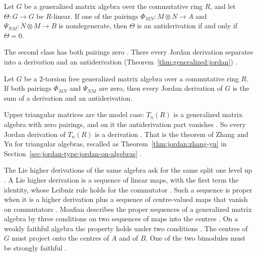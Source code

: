\begin{proposition}\label{prop:generalized:no-antiderivation}
Let $G$ be a generalized matrix algebra over the commutative ring $R$, and let
$\Theta\colon G\to G$ be $R$-linear. If one of the pairings
$\Phi_{MN}\colon M\otimes N\to A$ and $\Psi_{NM}\colon N\otimes M\to B$ is
nondegenerate, then $\Theta$ is an antiderivation if and only if $\Theta=0$.
\end{proposition}

The second class has both pairings zero \cite[p.~13]{LiVanWykWei2012}. There every
Jordan derivation separates into a derivation and an antiderivation (Theorem~\ref{thm:generalized:jordan})
\cite[p.~13]{LiVanWykWei2012}.\begin{theorem}\label{thm:generalized:jordan}
Let $G$ be a $2$-torsion free generalized matrix algebra over a commutative ring
$R$. If both pairings $\Phi_{MN}$ and $\Psi_{NM}$ are zero, then every Jordan
derivation of $G$ is the sum of a derivation and an antiderivation.
\end{theorem}

Upper triangular matrices are the model case: $T_n(R)$ is a generalized matrix
algebra with zero pairings, and on it the antiderivation part vanishes
\cite[Example~3.13, p.~14]{LiVanWykWei2012}. So every Jordan derivation of
$T_n(R)$ is a derivation \cite[Example~3.13, p.~14]{LiVanWykWei2012}. That is
the theorem of Zhang and Yu for triangular algebras, recalled as
Theorem~\ref{thm:jordan:zhang-yu} in
Section~\ref{sec:jordan-type:jordan-on-algebras} \cite[p.~1]{ChengJing2007}.

The Lie higher derivations of the same algebra ask for the same split one
level up \cite[p.~8]{Moafian2017}. A Lie higher derivation is a sequence of
linear maps, with the first term the identity, whose Leibniz rule holds for
the commutator \cite[p.~1]{Moafian2017}. Such a sequence is proper when it is
a higher derivation plus a sequence of centre-valued maps that vanish on
commutators \cite[p.~1]{Moafian2017}. Moafian describes the proper sequences
of a generalized matrix algebra by three conditions on two sequences of maps
into the centres \cite[Theorem~3.1, p.~8]{Moafian2017}. On a weakly faithful
algebra the property holds under two conditions \cite[Theorem~4.3,
p.~12]{Moafian2017}. The centres of $G$ must project onto the centres of $A$
and of $B$. One of the two bimodules must be strongly faithful
\cite[Theorem~4.3, p.~12]{Moafian2017}.


